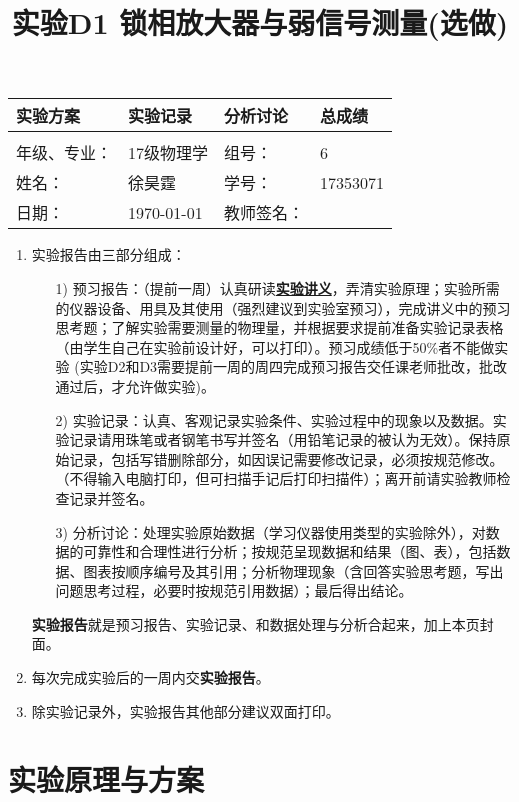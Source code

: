 \documentclass[11pt,a4paper]{ctexart}
\title{实验D1 锁相放大器与弱信号测量(选做)}
\begin{document}
\maketitle
\begin{tabular}{|p{8em}|p{8em}|p{8em}|p{5em}|}
\hline
		实验方案 &实验记录  &分析讨论 &总成绩\\
		\hline
		        &          &          &  \\
	    \hline
	\hline 
	年级、专业： &17级物理学 &组号：& 6 \\
	\hline
	姓名：& 徐昊霆 &学号：&17353071  \\
	\hline
	日期：& \today &教师签名： &  \\
    \hline	
        \end{tabular}

\begin{enumerate}
 \item 实验报告由三部分组成：
 \begin{enumerate}
  \item[1)]预习报告：（提前一周）认真研读\textbf{\uline{实验讲义}}，弄清实验原理；实验所需的仪器设备、用具及其使用（强烈建议到实验室预习），完成讲义中的预习思考题；了解实验需要测量的物理量，并根据要求提前准备实验记录表格（由学生自己在实验前设计好，可以打印）。预习成绩低于50\%者不能做实验{\color{red} (实验D2和D3需要提前一周的周四完成预习报告交任课老师批改，批改通过后，才允许做实验)}。

  \item[2)]实验记录：认真、客观记录实验条件、实验过程中的现象以及数据。实验记录请用珠笔或者钢笔书写并签名（{\color{red}用铅笔记录的被认为无效}）。{\color{red}保持原始记录，包括写错删除部分，如因误记需要修改记录，必须按规范修改。}（不得输入电脑打印，但可扫描手记后打印扫描件）；离开前请实验教师检查记录并签名。
  \item[3)]分析讨论：处理实验原始数据（学习仪器使用类型的实验除外），对数据的可靠性和合理性进行分析；按规范呈现数据和结果（图、表），包括数据、图表按顺序编号及其引用；分析物理现象（含回答实验思考题，写出问题思考过程，必要时按规范引用数据）；最后得出结论。
 \end{enumerate}
 \textbf{实验报告}就是预习报告、实验记录、和数据处理与分析合起来，加上本页封面。
 \item 每次完成实验后的一周内交\textbf{实验报告}。
 \item 除实验记录外，实验报告其他部分建议双面打印。
\end{enumerate}
\newpage
\tableofcontents
\newpage
\section{实验原理与方案}
\end{document}
